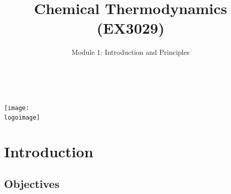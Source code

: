 \documentclass[10pt,compress,handout,ignorenonframetext]{beamer}
\institute{School of Engineering}
\title{Chemical Thermodynamics (EX3029)}
\subtitle{Module 1: Introduction and Principles}
\date[ ]{ }
\author[\shortname]{%
  \fullname\\\ttfamily{\emailaddress}
}
\newcommand{\logoimage}{../../FigBanner/UoAHorizBanner}
\begin{document}
\begin{frame}
  \titlepage
  \vfill%
  \begin{center}
    \texttt{[image: \\logoimage]}
  \end{center}
\end{frame}




\section{Introduction} 


\subsection{Objectives}
\end{document}

